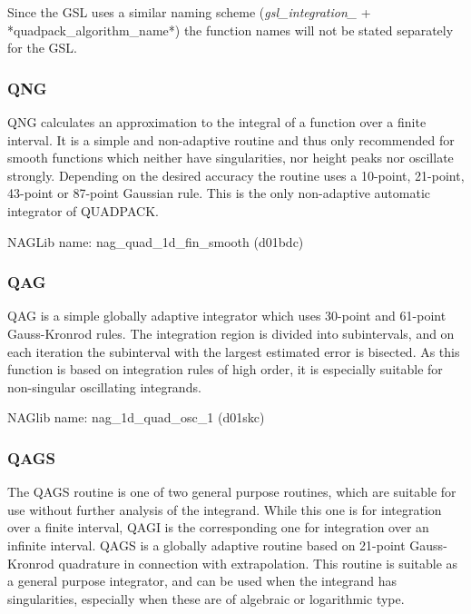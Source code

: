 Since the GSL uses a similar naming scheme (\emph{gsl\_integration\_} + *quadpack\_algorithm\_name*) the function names will not be stated separately for the GSL. 

\subsubsection{QNG}
QNG calculates an approximation to the integral of a function over a finite interval. It is a simple and non-adaptive routine and thus only recommended for smooth functions which neither have singularities, nor height peaks nor oscillate strongly. Depending on the desired accuracy the routine uses a 10-point, 21-point, 43-point or 87-point Gaussian rule. This is the only non-adaptive automatic integrator of QUADPACK. \cite{quadpack, GSL_Reference}

NAGLib name: nag\_quad\_1d\_fin\_smooth (d01bdc) \cite{nag_d01bdc}



\subsubsection{QAG}
QAG is a simple globally adaptive integrator which uses 30-point and 61-point Gauss-Kronrod rules. The integration region is divided into subintervals, and on each iteration the subinterval with the largest estimated error is bisected. As this function is based on integration rules of high order, it is especially suitable for non-singular oscillating integrands. \cite{nag_d01skc, quadpack, GSL_Reference}

NAGlib name: nag\_1d\_quad\_osc\_1 (d01skc) \cite{nag_d01skc}



\subsubsection{QAGS}
The QAGS routine is one of two general purpose routines, which are suitable for use without further analysis of the integrand. While this one is for integration over a finite interval, QAGI is the corresponding one for integration over an infinite interval. QAGS is a globally adaptive routine based on 21-point Gauss-Kronrod quadrature in connection with extrapolation. This routine is suitable as a general purpose integrator, and can be used when the integrand has singularities, especially when these are of algebraic or logarithmic type. \cite{quadpack, GSL_Reference, nag_d01sjc}

